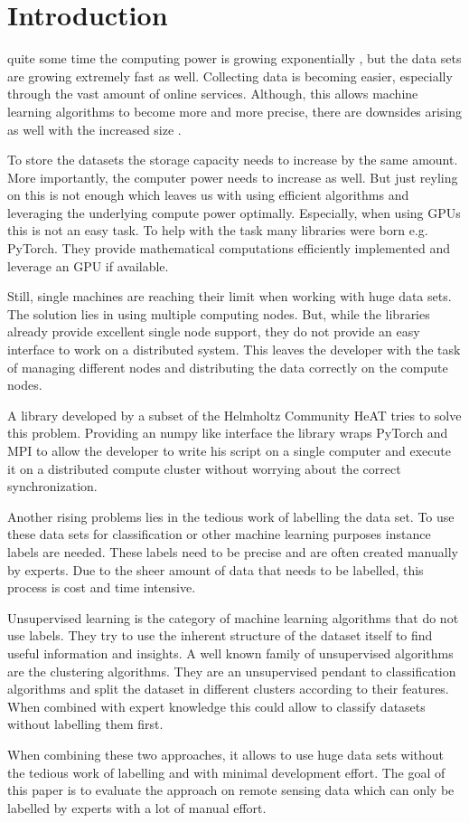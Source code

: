 
\section{Introduction}
\label{sec:intro}
  quite some time the computing power is growing exponentially \cite{moore_cramming_1998}, but the data sets are growing extremely fast as well.
Collecting data is becoming easier, especially through the vast amount of online services.
Although, this allows machine learning algorithms to become more and more precise, there are downsides arising as well with
the increased size \cite{khan_big_2014}.

To store the datasets the storage capacity needs to increase by the same amount. More importantly, the computer power needs to increase
as well. But just reyling on this is not enough which leaves us with using efficient algorithms and leveraging the underlying compute power optimally.
Especially, when using \glspl{GPU} this is not an easy task. To help with the task many libraries were born e.g. PyTorch.
They provide mathematical computations efficiently implemented and leverage an \gls{GPU} if available.

Still, single machines are reaching their limit when working with huge data sets. The solution lies in using multiple computing nodes.
But, while the libraries already provide excellent single node support, they do not provide an easy interface to work on a distributed system.
This leaves the developer with the task of managing different nodes and distributing the data correctly on the compute nodes.

A library developed by a subset of the Helmholtz Community \gls{HeAT} tries to solve this problem.
Providing an \gls{numpy} like interface the library wraps \gls{PyTorch} and \gls{MPI} to allow the developer to write his script on a single computer
and execute it on a distributed compute cluster without worrying about the correct synchronization.

Another rising problems lies in the tedious work of labelling the data set.
To use these data sets for classification or other machine learning purposes instance labels are needed.
These labels need to be precise and are often created manually by experts.
Due to the sheer amount of data that needs to be labelled, this process is cost and time intensive.

Unsupervised learning is the category of machine learning algorithms that do not use labels. They try to
use the inherent structure of the dataset itself to find useful information and insights.
A well known family of unsupervised algorithms are the clustering algorithms. They are an unsupervised pendant to classification algorithms
and split the dataset in different clusters according to their features.
When combined with expert knowledge this could allow to classify datasets without labelling them first.

When combining these two approaches, it allows to use huge data sets without the tedious work of labelling and with minimal development effort.
The goal of this paper is to evaluate the approach on remote sensing data which can only be labelled by experts with a lot of manual effort.
